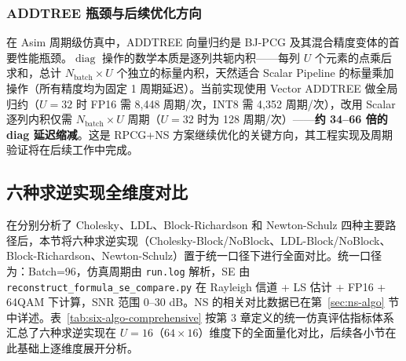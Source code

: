 \documentclass{CjC}
\begin{document}
    \subsubsection{ADDTREE 瓶颈与后续优化方向}
    
    在 Asim 周期级仿真中，ADDTREE 向量归约是 BJ-PCG 及其混合精度变体的首要性能瓶颈。$\operatorname{diag}$ 操作的数学本质是逐列共轭内积——每列 $U$ 个元素的点乘后求和，总计 $N_{\text{batch}}\times U$ 个独立的标量内积，天然适合 Scalar Pipeline 的标量乘加操作（所有精度均为固定 1 周期延迟）。当前实现使用 Vector ADDTREE 做全局归约（$U=32$ 时 FP16 需 8,448 周期/次，INT8 需 4,352 周期/次），改用 Scalar 逐列内积仅需
    $N_{\text{batch}}\times U$ 周期（$U=32$ 时为 128 周期/次）——\textbf{约 34--66 倍的 diag 延迟缩减}。这是 RPCG+NS 方案继续优化的关键方向，其工程实现及周期验证将在后续工作中完成。

    
    
    \subsection{六种求逆实现全维度对比}
    \label{sec:five-compare}

    在分别分析了 Cholesky、LDL、Block-Richardson 和 Newton-Schulz 四种主要路径后，本节将六种求逆实现（Cholesky-Block/NoBlock、LDL-Block/NoBlock、Block-Richardson、Newton-Schulz）置于统一口径下进行全面对比。统一口径为：Batch=96，仿真周期由
    \texttt{run.log} 解析，SE 由 \texttt{reconstruct\_formula\_se\_compare.py} 在
    Rayleigh 信道 + LS 估计 + FP16 + 64QAM 下计算，SNR 范围 0--30 dB。NS
    的相关对比数据已在第~\ref{sec:ns-algo} 节中详述。表~\ref{tab:six-algo-comprehensive} 按第 3 章定义的统一仿真评估指标体系汇总了六种求逆实现在 $U=16$（$64\times16$）维度下的全面量化对比，后续各小节在此基础上逐维度展开分析。
\end{document}
